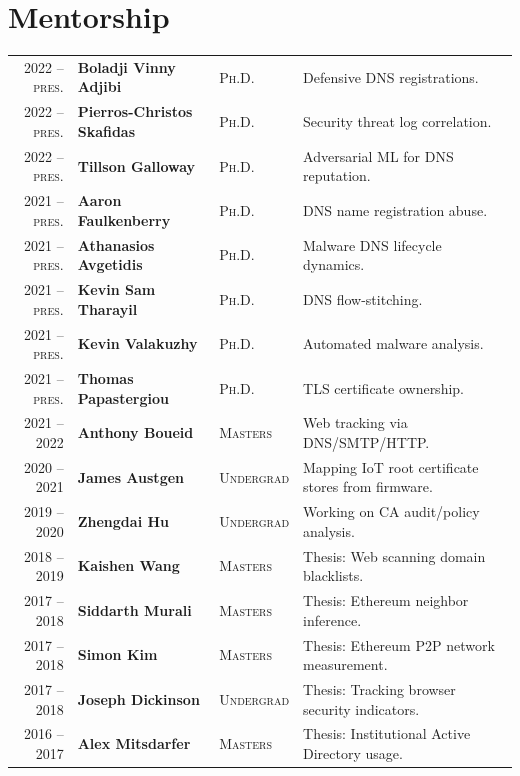 \documentclass[10pt,singlecolumn]{article} %
\begin{document}
\section{Mentorship} 
\begin{tabular}{rlll}
2022 -- \textsc{pres.} & \textbf{Boladji Vinny Adjibi} & \textsc{Ph.D.} & Defensive DNS registrations.\\ 
2022 -- \textsc{pres.} & \textbf{Pierros-Christos Skafidas} & \textsc{Ph.D.} & Security threat log correlation.\\ 
2022 -- \textsc{pres.} & \textbf{Tillson Galloway} & \textsc{Ph.D.} & Adversarial ML for DNS reputation.\\ 
2021 -- \textsc{pres.} & \textbf{Aaron Faulkenberry} & \textsc{Ph.D.} & DNS name registration abuse.\\ 
2021 -- \textsc{pres.} & \textbf{Athanasios Avgetidis} & \textsc{Ph.D.} & Malware DNS lifecycle dynamics.\\ 
2021 -- \textsc{pres.} & \textbf{Kevin Sam Tharayil} & \textsc{Ph.D.} & DNS flow-stitching.\\ 
2021 -- \textsc{pres.} & \textbf{Kevin Valakuzhy} & \textsc{Ph.D.} & Automated malware analysis.\\ 
2021 -- \textsc{pres.} & \textbf{Thomas Papastergiou} & \textsc{Ph.D.} & TLS certificate ownership.\\ 
	2021 -- 2022			 & \textbf{Anthony Boueid} & \textsc{Masters} & Web tracking via DNS/SMTP/HTTP.\\ 
2020 -- 2021             & \textbf{James Austgen} & \textsc{Undergrad} & Mapping IoT root certificate stores from firmware.\\ 
2019 -- 2020	         & \textbf{Zhengdai Hu} & \textsc{Undergrad} & Working on CA audit/policy analysis.\\ 
2018 -- 2019	         & \textbf{Kaishen Wang} & \textsc{Masters} & Thesis: Web scanning domain blacklists.\\
2017 -- 2018	         & \textbf{Siddarth Murali} & \textsc{Masters} & Thesis: Ethereum neighbor inference.\\ 
2017 -- 2018	         & \textbf{Simon Kim} & \textsc{Masters} & Thesis: Ethereum P2P network measurement.\\  
2017 -- 2018	         & \textbf{Joseph Dickinson} & \textsc{Undergrad} & Thesis: Tracking browser security indicators.\\  
2016 -- 2017	         & \textbf{Alex Mitsdarfer} & \textsc{Masters} & Thesis: Institutional Active Directory usage.\\ 
\end{tabular}\\
\end{document}
